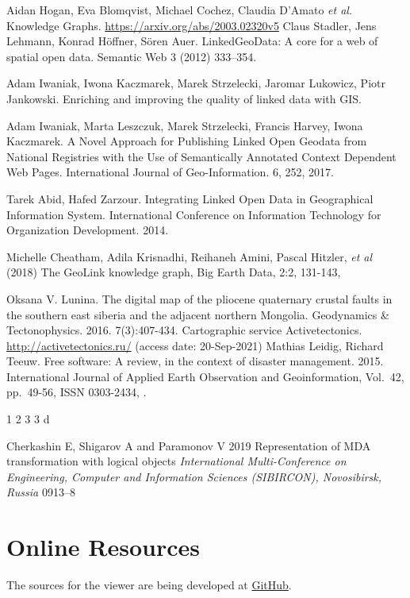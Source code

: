 \documentclass[
]{ceurart}
\begin{document}
\begin{thebibliography}{99}

 Aidan Hogan, Eva Blomqvist, Michael Cochez, Claudia D’Amato \emph{et al}. Knowledge Graphs. \url{https://arxiv.org/abs/2003.02320v5}
 Claus Stadler, Jens Lehmann, Konrad Höffner, Sören Auer. LinkedGeoData: A core for a web of spatial open data. Semantic Web 3 (2012) 333–354. 

 Adam Iwaniak, Iwona Kaczmarek, Marek Strzelecki, Jaromar Lukowicz, Piotr Jankowski. Enriching and improving the quality of linked data with GIS. 

 Adam Iwaniak, Marta Leszczuk, Marek Strzelecki, Francis Harvey, Iwona Kaczmarek. A Novel Approach for Publishing Linked Open Geodata from National Registries with the Use of Semantically Annotated Context Dependent Web Pages. International Journal of Geo-Information. 6, 252, 2017. 

 Tarek Abid, Hafed Zarzour. Integrating Linked Open Data in Geographical
Information System. International Conference on Information Technology for Organization Development. 2014.

 Michelle Cheatham, Adila Krisnadhi, Reihaneh Amini, Pascal Hitzler, \emph{et al} (2018) The GeoLink knowledge graph, Big Earth Data, 2:2, 131-143, 

 Oksana V. Lunina.  The digital map of the pliocene quaternary crustal faults in the southern east siberia and the adjacent northern Mongolia. Geodynamics \& Tectonophysics. 2016. 7(3):407-434. 
 Cartographic service Activetectonics. \url{http://activetectonics.ru/} (access date: 20-Sep-2021)
 Mathias Leidig, Richard Teeuw. Free software: A review, in the context of disaster management. 2015. International Journal of Applied Earth Observation and Geoinformation,
Vol.~42, pp.~49-56, ISSN 0303-2434, .

 1
 2
 3
 3
 d

  Cherkashin E, Shigarov A and Paramonov V 2019 Representation of MDA transformation with logical objects \emph{International Multi-Conference on Engineering, Computer and Information Sciences (SIBIRCON), Novosibirsk, Russia} 0913--8 


\end{thebibliography}

\appendix

\section{Online Resources}

The sources for the viewer are being developed at
\href{https://github.com/De17eon/GRL}{GitHub}.
\end{document}
